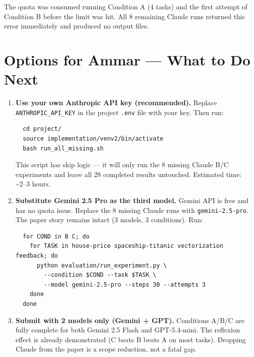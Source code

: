 \documentclass[11pt,a4paper]{article}
\begin{document}
The quota was consumed running Condition A (4 tasks) and the first attempt of Condition B
before the limit was hit. All 8 remaining Claude runs returned this error immediately and
produced no output files.

\section*{Options for Ammar --- What to Do Next}

\begin{enumerate}[leftmargin=1.5em, itemsep=6pt]

  \item \textbf{Use your own Anthropic API key (recommended).}
        Replace \texttt{ANTHROPIC\_API\_KEY} in the project \texttt{.env} file with your key.
        Then run:
        \begin{verbatim}
  cd project/
  source implementation/venv2/bin/activate
  bash run_all_missing.sh
        \end{verbatim}
        This script has skip logic --- it will only run the 8 missing Claude B/C experiments
        and leave all 28 completed results untouched.
        Estimated time: \textasciitilde2--3 hours.

  \item \textbf{Substitute Gemini 2.5 Pro as the third model.}
        Gemini API is free and has no quota issue. Replace the 8 missing Claude runs with
        \texttt{gemini-2.5-pro}. The paper story remains intact (3 models, 3 conditions).
        Run:
        \begin{verbatim}
  for COND in B C; do
    for TASK in house-price spaceship-titanic vectorization feedback; do
      python evaluation/run_experiment.py \
        --condition $COND --task $TASK \
        --model gemini-2.5-pro --steps 30 --attempts 3
    done
  done
        \end{verbatim}

  \item \textbf{Submit with 2 models only (Gemini + GPT).}
        Conditions A/B/C are fully complete for both Gemini 2.5 Flash and GPT-5.4-mini.
        The reflexion effect is already demonstrated (C beats B beats A on most tasks).
        Dropping Claude from the paper is a scope reduction, not a fatal gap.

\end{enumerate}

\end{document}
